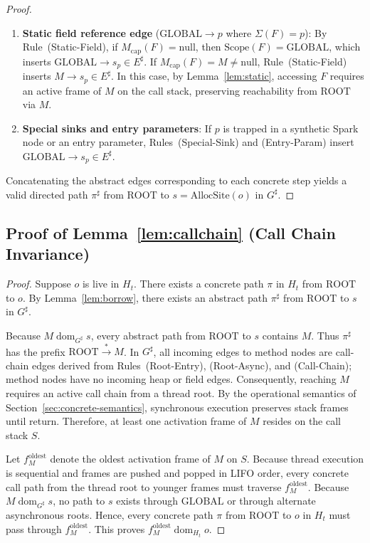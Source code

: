 \documentclass[12pt,a4paper]{article}
\newcommand{\GLOBAL}{\text{GLOBAL}}
\newcommand{\ROOT}{\text{ROOT}}
\newcommand{\dom}{\mathrel{\text{dom}}}
\newcommand{\Scope}{\text{Scope}}
\begin{document}
\begin{proof}
\begin{enumerate}[leftmargin=*]
  \item \textbf{Static field reference edge} ($\GLOBAL \to p$ where $\Sigma(F) = p$): By Rule~(Static-Field), if $M_{\text{cap}}(F) = \text{null}$, then $\Scope(F) = \GLOBAL$, which inserts $\GLOBAL \to s_p \in E^\sharp$. If $M_{\text{cap}}(F) = M \neq \text{null}$, Rule~(Static-Field) inserts $M \to s_p \in E^\sharp$. In this case, by Lemma~\ref{lem:static}, accessing $F$ requires an active frame of $M$ on the call stack, preserving reachability from $\ROOT$ via $M$.
  \item \textbf{Special sinks and entry parameters}: If $p$ is trapped in a synthetic Spark node or an entry parameter, Rules~(Special-Sink) and (Entry-Param) insert $\GLOBAL \to s_p \in E^\sharp$.
\end{enumerate}
Concatenating the abstract edges corresponding to each concrete step yields a valid directed path $\pi^\sharp$ from $\ROOT$ to $s = \text{AllocSite}(o)$ in $G^\sharp$.
\end{proof}

\subsection{Proof of Lemma~\ref{lem:callchain} (Call Chain Invariance)}
\label{sec:proof-lem-callchain}

\begin{proof}
Suppose $o$ is live in $H_t$. There exists a concrete path $\pi$ in $H_t$ from $\ROOT$ to $o$. By Lemma~\ref{lem:borrow}, there exists an abstract path $\pi^\sharp$ from $\ROOT$ to $s$ in $G^\sharp$.

Because $M \dom_{G^\sharp} s$, every abstract path from $\ROOT$ to $s$ contains $M$. Thus $\pi^\sharp$ has the prefix $\ROOT \xrightarrow{*} M$. In $G^\sharp$, all incoming edges to method nodes are call-chain edges derived from Rules~(Root-Entry), (Root-Async), and (Call-Chain); method nodes have no incoming heap or field edges. Consequently, reaching $M$ requires an active call chain from a thread root. By the operational semantics of Section~\ref{sec:concrete-semantics}, synchronous execution preserves stack frames until return. Therefore, at least one activation frame of $M$ resides on the call stack $S$.

Let $f_M^{\text{oldest}}$ denote the oldest activation frame of $M$ on $S$. Because thread execution is sequential and frames are pushed and popped in LIFO order, every concrete call path from the thread root to younger frames must traverse $f_M^{\text{oldest}}$. Because $M \dom_{G^\sharp} s$, no path to $s$ exists through $\GLOBAL$ or through alternate asynchronous roots. Hence, every concrete path $\pi$ from $\ROOT$ to $o$ in $H_t$ must pass through $f_M^{\text{oldest}}$. This proves $f_M^{\text{oldest}} \dom_{H_t} o$.
\end{proof}
\end{document}
